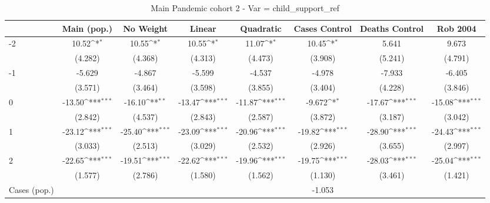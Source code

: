 \documentclass{article}
\begin{document}
{
\def\sym#1{\ifmmode^{#1}\else\(^{#1}\)\fi}
\begin{longtable}{l*{7}{c}}
\caption{Main Pandemic cohort 2 - Var = child\_support\_ref}\\
\hline\hline\endfirsthead\hline\endhead\hline\endfoot\endlastfoot
                &\multicolumn{1}{c}{Main (pop.)}&\multicolumn{1}{c}{No Weight}&\multicolumn{1}{c}{Linear}&\multicolumn{1}{c}{Quadratic}&\multicolumn{1}{c}{Cases Control}&\multicolumn{1}{c}{Deaths Control}&\multicolumn{1}{c}{Rob 2004}\\
\hline
-2              &    10.52\sym{*}  &    10.55\sym{*}  &    10.55\sym{*}  &    11.07\sym{*}  &    10.45\sym{*}  &    5.641         &    9.673         \\
                &  (4.282)         &  (4.368)         &  (4.313)         &  (4.473)         &  (3.908)         &  (5.241)         &  (4.791)         \\
-1              &   -5.629         &   -4.867         &   -5.599         &   -4.537         &   -4.978         &   -7.933         &   -6.405         \\
                &  (3.571)         &  (3.464)         &  (3.598)         &  (3.855)         &  (3.404)         &  (4.228)         &  (3.846)         \\
0               &   -13.50\sym{***}&   -16.10\sym{**} &   -13.47\sym{***}&   -11.87\sym{***}&   -9.672\sym{*}  &   -17.67\sym{***}&   -15.08\sym{***}\\
                &  (2.842)         &  (4.537)         &  (2.843)         &  (2.587)         &  (3.872)         &  (3.187)         &  (3.042)         \\
1               &   -23.12\sym{***}&   -25.40\sym{***}&   -23.09\sym{***}&   -20.96\sym{***}&   -19.82\sym{***}&   -28.90\sym{***}&   -24.43\sym{***}\\
                &  (3.033)         &  (2.513)         &  (3.029)         &  (2.532)         &  (2.926)         &  (3.655)         &  (2.997)         \\
2               &   -22.65\sym{***}&   -19.51\sym{***}&   -22.62\sym{***}&   -19.96\sym{***}&   -19.75\sym{***}&   -28.03\sym{***}&   -25.04\sym{***}\\
                &  (1.577)         &  (2.786)         &  (1.580)         &  (1.562)         &  (1.130)         &  (3.461)         &  (1.421)         \\
Cases (pop.)    &                  &                  &                  &                  &   -1.053         &                  &                  \\

\end{longtable}}
\end{document}
